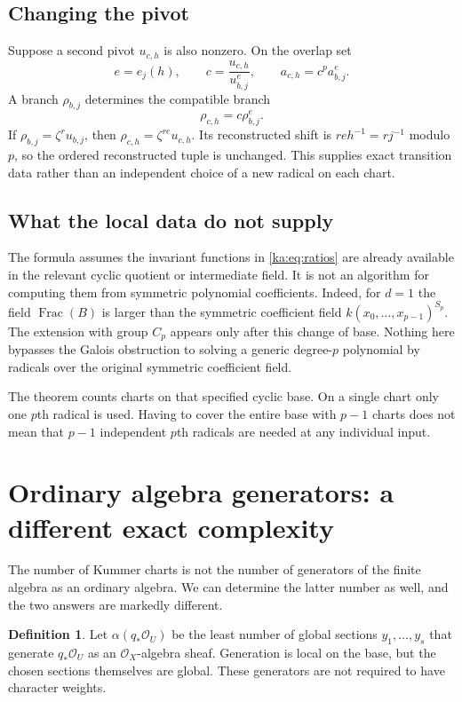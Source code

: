 \documentclass[11pt,a4paper]{article}
\theoremstyle{definition}
\newtheorem{definition}[theorem]{Definition}
\theoremstyle{remark}
\newcommand{\OO}{\mathcal O}
\newcommand{\alggen}{\alpha}
\begin{document}
\subsection{Changing the pivot}
Suppose a second pivot $u_{c,h}$ is also nonzero. On the overlap set
\[
 e=e_j(h),\qquad c=\frac{u_{c,h}}{u_{b,j}^{e}},
 \qquad a_{c,h}=c^p a_{b,j}^{e}.
\]
A branch $\rho_{b,j}$ determines the compatible branch
\begin{equation}
 \rho_{c,h}=c\rho_{b,j}^{e}.
 \label{ka:eq:transition}
\end{equation}
If $\rho_{b,j}=\zeta^r u_{b,j}$, then
$\rho_{c,h}=\zeta^{re}u_{c,h}$. Its reconstructed shift is
$re h^{-1}=rj^{-1}$ modulo $p$, so the ordered reconstructed tuple is
unchanged. This supplies exact transition data rather than an
independent choice of a new radical on each chart.

\subsection{What the local data do not supply}
The formula assumes the invariant functions in \eqref{ka:eq:ratios} are
already available in the relevant cyclic quotient or intermediate field.
It is not an algorithm for computing them from symmetric polynomial
coefficients. Indeed, for $d=1$ the field $\operatorname{Frac}(B)$ is
larger than the symmetric coefficient field
$k(x_0,\ldots,x_{p-1})^{S_p}$. The extension with group $C_p$ appears
only after this change of base. Nothing here bypasses the Galois
obstruction to solving a generic degree-$p$ polynomial by radicals over
the original symmetric coefficient field.

The theorem counts charts on that specified cyclic base. On a single
chart only one $p$th radical is used. Having to cover the entire base
with $p-1$ charts does not mean that $p-1$ independent $p$th radicals
are needed at any individual input.

\section{Ordinary algebra generators: a different exact complexity}
\label{ka:sec:algebragenerators}

The number of Kummer charts is not the number of generators of the
finite algebra as an ordinary algebra. We can determine the latter
number as well, and the two answers are markedly different.

\begin{definition}
Let $\alggen(q_*\OO_U)$ be the least number of global sections
$y_1,\ldots,y_s$ that generate $q_*\OO_U$ as an $\OO_X$-algebra sheaf.
Generation is local on the base, but the chosen sections themselves are
global. These generators are not required to have character weights.
\end{definition}
\end{document}
